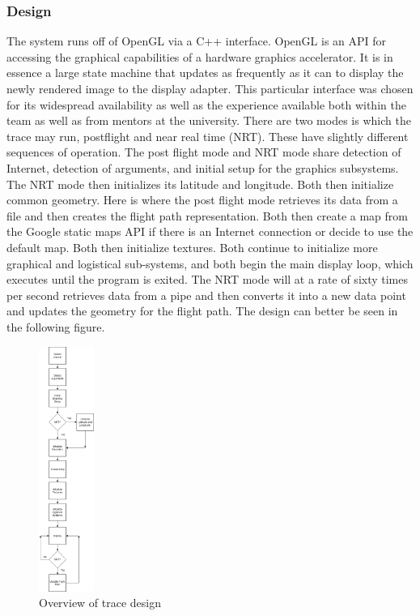 \documentclass[onecolumn, draftclsnofoot,10pt, compsoc]{IEEEtran}
\begin{document}
\subsubsection{Design}
The system runs off of OpenGL via a C++ interface. OpenGL is an API for accessing the graphical capabilities of a hardware graphics accelerator. It is in essence a large state machine that updates as frequently as it can to display the newly rendered image to the display adapter. This particular interface was chosen for its widespread availability as well as the experience available both within the team as well as from mentors at the university.
There are two modes is which the trace may run, postflight and near real time (NRT). These have slightly different sequences of operation. The post flight mode and NRT mode share detection of Internet, detection of arguments, and initial setup for the graphics subsystems. The NRT mode then initializes its latitude and longitude. Both then initialize common geometry. Here is where the post flight mode retrieves its data from a file and then creates the flight path representation. Both then create a map from the Google static maps API if there is an Internet connection or decide to use the default map. Both then initialize textures. Both continue to initialize more graphical and logistical sub-systems, and both begin the main display loop, which executes until the program is exited. The NRT mode will at a rate of sixty times per second retrieves data from a pipe and then converts it into a new data point and updates the geometry for the flight path. The design can better be seen in the following figure.
\begin{figure}[h]
    \centering
        \includegraphics[height=8cm]{trace}
        \caption{Overview of trace design}
        \label{fig:trace}
\end{figure}
\end{document}
